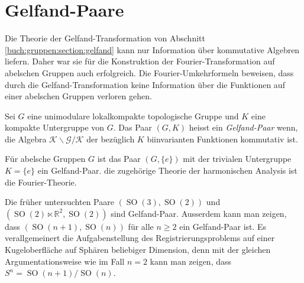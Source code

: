 %
%
%
\section{Gelfand-Paare
\label{buch:nichtkomm:section:gelfand}}
Die Theorie der Gelfand-Transformation von Abschnitt
\ref{buch:gruppen:section:gelfand}
kann nur Information über kommutative Algebren liefern.
Daher war sie für die Konstruktion der Fourier-Transformation
auf abelschen Gruppen auch erfolgreich.
Die Fourier-Umkehrformeln beweisen, dass durch die Gelfand-Transformation
keine Information über die Funktionen auf einer abelschen Gruppen
verloren gehen.

\begin{definition}
Sei $G$ eine unimodulare lokalkompakte topologische Gruppe und
$K$ eine kompakte Untergruppe von $G$.
Das Paar $(G,K)$ heisst ein {\em Gelfand-Paar} wenn, die Algebra
$\mathscr{K\backslash G/K}$ der bezüglich $K$ biinvarianten Funktionen
kommutativ ist.
\end{definition}

Für abelsche Gruppen $G$ ist das Paar $(G,\{e\})$ mit der trivialen
Untergruppe $K=\{e\}$ ein Gelfand-Paar.
die zugehörige Theorie der harmonischen Analysis ist die Fourier-Theorie.

Die früher untersuchten Paare $(\operatorname{SO}(3),\operatorname{SO}(2))$
und $(\operatorname{SO}(2)\ltimes \mathbb{R}^2,\operatorname{SO}(2))$
sind Gelfand-Paar.
Ausserdem kann man zeigen, dass $(\operatorname{SO}(n+1),\operatorname{SO}(n))$
für alle $n\ge 2$ ein Gelfand-Paar ist.
Es verallgemeinert die Aufgabenstellung des Registrierungsproblems
auf einer Kugeloberfläche auf Sphären beliebiger Dimension, denn mit
der gleichen Argumentationsweise wie im Fall $n=2$ kann man zeigen,
dass $S^n = \operatorname{SO}(n+1)/\operatorname{SO}(n)$.



